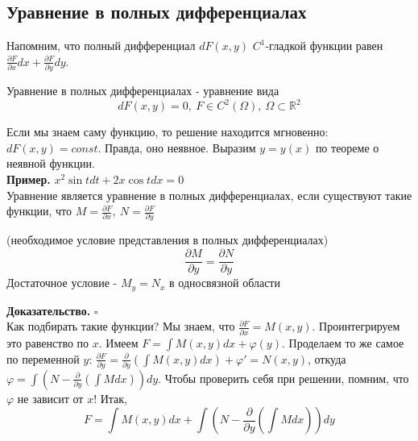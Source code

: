 \subsection{Уравнение в полных дифференциалах}
Напомним, что полный дифференциал $dF(x,y)$  $C^1$-гладкой функции
равен  $\frac{\partial F}{\partial x} dx+\frac{\partial F}{\partial y}dy$.
\begin{defin}
Уравнение в полных дифференциалах - уравнение вида
$$dF(x,y)=0,~F\in C^2(\Omega),~\Omega\subset \mathbb{R}^2$$
\end{defin}
Если мы знаем саму функцию, то решение находится мгновенно: $dF(x,y)=const$.
Правда, оно неявное. Выразим  $y=y(x)$ по теореме о неявной функции.\\
\textbf{Пример.} $x^2\sin{t}dt+2x\cos{t}dx=0$\\
Уравнение является уравнение в полных дифференциалах, если существуют такие
функции, что $M=\frac{\partial F}{\partial x},~N=\frac{\partial F}{\partial y}$
\begin{theor}
    (необходимое условие представления в полных дифференциалах)\\
    $$\frac{\partial M}{\partial y}=\frac{\partial N}{\partial y}$$ 
    Достаточное условие - $M_y=N_x$ в односвязной области
\end{theor}
\textbf{Доказательство.} $\square$ \\
Как подбирать такие функции? Мы знаем, что $\frac{\partial F}{\partial x}=
M(x,y)$. Проинтегрируем это равенство по $x$. Имеем  $F=\int M(x,y)dx+
\varphi(y)$. Проделаем то же самое по переменной $y$:  $\frac{\partial F}
{\partial y}=\frac{\partial }{\partial y}(\int M(x,y)dx)+\varphi'=N(x,y)$,
откуда $\varphi=\int\left(N-\frac{\partial }{\partial y}(\int Mdx) \right)dy$.
Чтобы проверить себя при решении, помним, что $\varphi$ не зависит от $x$!
Итак,
$$F=\int M(x,y)dx+\int\left(N-\frac{\partial }{\partial y}\left(\int Mdx
\right)\right)dy$$
